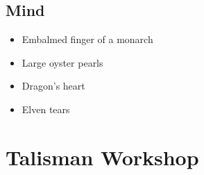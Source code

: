 \begin{multicols}{2}
\subsection{Mind}

\begin{itemize}
  \item
  Embalmed finger of a monarch
  \item
  Large oyster pearls
  \item
  Dragon's heart
  \item
  Elven tears
\end{itemize}

\end{multicols}

\section{Talisman Workshop}

